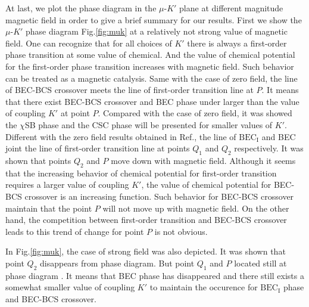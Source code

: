 \documentclass[prd, showpacs,nofootinbib,amsmath,amssymb]{revtex4}
\begin{document}
At last,
we plot the phase diagram in the $\mu$-$K'$ plane at different magnitude magnetic field in order to give a brief summary for our results.
First we show the $\mu$-$K'$ phase diagram Fig.\ref{fig:muk} at a relatively not strong value of magnetic field. One can recognize that for all choices of $K'$ there is always a first-order phase transition at some value of chemical.
And the value of chemical potential for the first-order phase transition increases with magnetic field.
Such behavior can be treated as a magnetic catalysis.
Same with the case of zero field, the line of BEC-BCS crossover meets the line of first-order transition line at $P$.
It means that there exist BEC-BCS crossover and BEC phase under larger than the value of coupling $K'$ at point $P$.
Compared with the case of zero field,  it was showed  the $\chi$SB phase and the CSC phase will be presented for smaller values of $K'$.
Different with the zero field results obtained in Ref.,  the
line of $\text{BEC}_\text{I}$ and BEC joint the line of first-order transition line at points $Q_1$ and $Q_2$ respectively.
It was shown that  points $Q_2$ and  $P$ move down with magnetic field.
Although it seems that the increasing behavior of chemical potential for first-order transition requires a larger value of coupling $K'$, the value of chemical potential for BEC-BCS crossover is an increasing function.
Such behavior for BEC-BCS crossover  maintain that the point $P$ will not move up with magnetic field.
On the other hand, the competition between  first-order transition and BEC-BCS crossover leads to this trend of change for point $P$ is not obvious.

In Fig.\ref{fig:muk}, the case of strong field was also depicted.
It was shown that point $Q_2$ disappears from phase diagram.
But  point $Q_1$ and $P$ located still at phase diagram .  It means that BEC phase has disappeared and there still exists a somewhat smaller value of coupling $K'$ to maintain the occurence for $\text{BEC}_\text{I}$ phase and BEC-BCS crossover.
\end{document}
